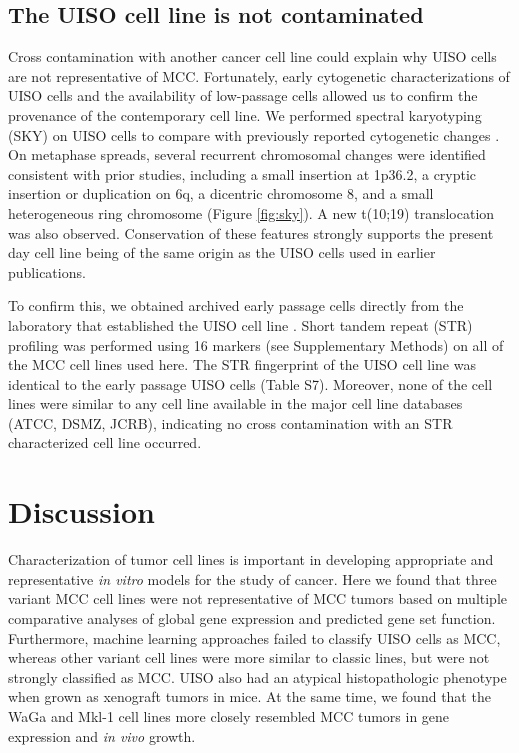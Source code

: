 \documentclass[10pt]{article}
\begin{document}
\subsection*{The UISO cell line is not contaminated}
Cross contamination with another cancer cell line could explain why UISO cells are not representative of MCC.
Fortunately, early cytogenetic characterizations of UISO cells and the availability of low-passage cells allowed us to confirm the provenance of the contemporary cell line.
We performed spectral karyotyping (SKY) on UISO cells to compare with previously reported cytogenetic changes \citep{VanGele2002Combined,VanGele1998Characteristic}.
On metaphase spreads, several recurrent chromosomal changes were identified consistent with prior studies, including a small insertion at 1p36.2, a cryptic insertion or duplication on 6q, a dicentric chromosome 8, and a small heterogeneous ring chromosome (Figure \ref{fig:sky}).
A new t(10;19) translocation was also observed.
Conservation of these features strongly supports the present day cell line being of the same origin as the UISO cells used in earlier publications.

To confirm this, we obtained archived early passage cells directly from the laboratory that established the UISO cell line \citep{Ronan1993Merkel}.
Short tandem repeat (STR) profiling \citep{Masters2001Short} was performed using 16 markers (see Supplementary Methods) on all of the MCC cell lines used here.
The STR fingerprint of the UISO cell line was identical to the early passage UISO cells (Table S7).
Moreover,  none of the cell lines were similar to any cell line available in the major cell line databases (ATCC, DSMZ, JCRB), indicating no cross contamination with an STR characterized cell line occurred.

\section*{Discussion}

Characterization of tumor cell lines is important in developing appropriate and representative \emph{in vitro} models for the study of cancer.
Here we found that three variant MCC cell lines were not representative of MCC tumors based on multiple comparative analyses of global gene expression and predicted gene set function.
Furthermore, machine learning approaches failed to classify UISO cells as MCC, whereas other variant cell lines were more similar to classic lines, but were not strongly classified as MCC.
UISO also had an atypical histopathologic phenotype when grown as xenograft tumors in mice.
At the same time, we found that the WaGa and Mkl-1 cell lines more closely resembled MCC tumors in gene expression and \emph{in vivo} growth.
\end{document}
